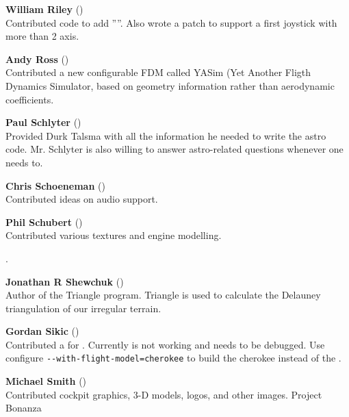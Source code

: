 \noindent \textbf{William Riley} ()\\
  Contributed code to add ''''. Also wrote a patch to support a first
  joystick with more than 2 axis.
 \medskip
 
\noindent \textbf{Andy Ross} ()\\
 Contributed a new configurable FDM called YASim (Yet Another Fligth Dynamics Simulator, based on geometry information rather than aerodynamic coefficients.
 \medskip

\noindent \textbf{Paul Schlyter} ()\\
  Provided Durk Talsma with all the information he needed to write the
  astro code. Mr. Schlyter is also willing to answer astro-related questions
  whenever one needs to.
  \medskip
  
 \medskip

\noindent \textbf{Chris Schoeneman}
()\\
  Contributed ideas on audio support.
 \medskip

\noindent \textbf{Phil Schubert} ()\\
  Contributed various textures and engine modelling.
   \medskip

  .
  \medskip

 \noindent \textbf{Jonathan R Shewchuk}
()\\
  Author of the Triangle program.  Triangle
  is used to calculate the  Delauney triangulation of our irregular terrain.
 \medskip

\noindent \textbf{Gordan Sikic} ()\\
  Contributed a  for .  Currently is not
  working and needs to be debugged.  Use configure
  \texttt{-$ $-with-flight-model=cherokee}
  to build the cherokee instead of the .
 \medskip

\noindent \textbf{Michael Smith} ()\\
  Contributed cockpit graphics, 3-D models, logos, and other images.
  Project Bonanza
   \medskip

